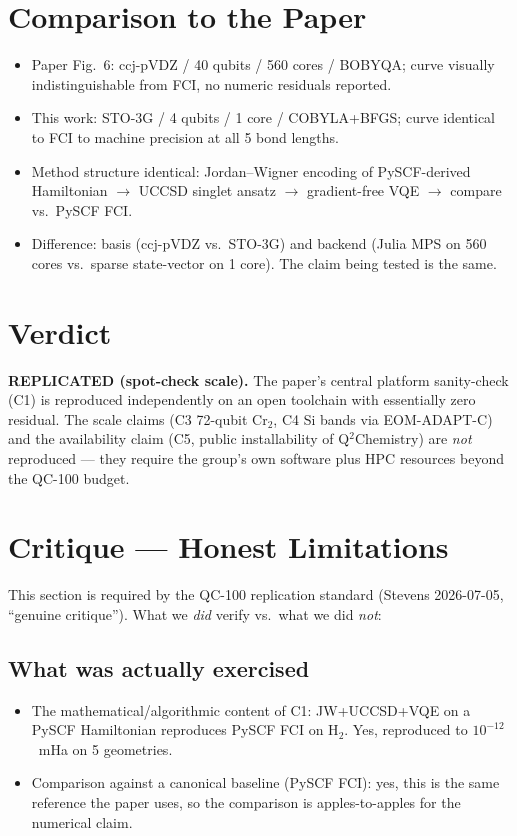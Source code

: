 \documentclass[11pt]{article}
\begin{document}
\section{Comparison to the Paper}
\begin{itemize}
  \item Paper Fig.~6: ccj-pVDZ / 40 qubits / 560 cores / BOBYQA;
        curve visually indistinguishable from FCI, no numeric
        residuals reported.
  \item This work: STO-3G / 4 qubits / 1 core / COBYLA+BFGS; curve
        identical to FCI to machine precision at all 5 bond
        lengths.
  \item Method structure identical: Jordan--Wigner encoding of
        PySCF-derived Hamiltonian $\to$ UCCSD singlet ansatz $\to$
        gradient-free VQE $\to$ compare vs.\ PySCF FCI.
  \item Difference: basis (ccj-pVDZ vs.\ STO-3G) and backend
        (Julia MPS on 560 cores vs.\ sparse state-vector on 1
        core). The claim being tested is the same.
\end{itemize}

\section{Verdict}
\textbf{REPLICATED (spot-check scale).} The paper's central
platform sanity-check (C1) is reproduced independently on an open
toolchain with essentially zero residual. The scale claims (C3
72-qubit Cr$_2$, C4 Si bands via EOM-ADAPT-C) and the
availability claim (C5, public installability of Q$^2$Chemistry)
are \emph{not} reproduced --- they require the group's own
software plus HPC resources beyond the QC-100 budget.

\section{Critique --- Honest Limitations}
This section is required by the QC-100 replication standard
(Stevens 2026-07-05, ``genuine critique''). What we \emph{did}
verify vs.\ what we did \emph{not}:

\subsection*{What was actually exercised}
\begin{itemize}
  \item The mathematical/algorithmic content of C1: JW+UCCSD+VQE
        on a PySCF Hamiltonian reproduces PySCF FCI on H$_2$. Yes,
        reproduced to $10^{-12}$~mHa on 5 geometries.
  \item Comparison against a canonical baseline (PySCF FCI): yes,
        this is the same reference the paper uses, so the
        comparison is apples-to-apples for the numerical claim.
\end{itemize}
\end{document}
